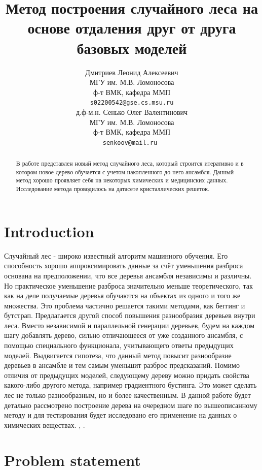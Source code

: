 \documentclass{article}
\title{Метод построения случайного леса на основе отдаления друг от друга базовых моделей}
\author{ Дмитриев Леонид Алексеевич  \\
	МГУ им. М.В. Ломоносова\\
	ф-т ВМК, кафедра ММП\\
	\texttt{s02200542@gse.cs.msu.ru} \\
	\And
	д.ф-м.н. Сенько Олег Валентинович \\
	МГУ им. М.В. Ломоносова\\
	ф-т ВМК, кафедра ММП\\
	\texttt{senkoov@mail.ru } \\
}
\date{}
\begin{document}
\maketitle

\begin{abstract}
	В работе представлен новый метод случайного леса, который строится итеративно и в котором новое дерево обучается с учетом накопленного до него ансамбля. Данный метод хорошо проявляет себя на некоторых химических и медицинских данных. Исследование метода проводилось на датасете кристаллических решеток.
\end{abstract}



\section{Introduction}

Случайный лес - широко известный алгоритм машинного обучения.
Его способность хорошо аппроксимировать данные за счёт
уменьшения разброса основана на предположении, что все деревья
ансамбля независимы и различны. Но практическое уменьшение
разброса значительно меньше теоретического, так как на деле
получаемые деревья обучаются на объектах из одного и того же
множества. Это проблема частично решается такими методами, как
беггинг и бутстрап.
Предлагается другой способ повышения разнообразия деревьев
внутри леса. Вместо независимой и параллельной генерации деревьев,
будем на каждом шагу добавлять дерево, сильно отличающееся от уже
созданного ансамбля, с помощью специального функционала,
учитывающего ответы предыдущих моделей. Выдвигается гипотеза,
что данный метод повысит разнообразие деревьев в ансамбле и тем
самым уменьшит разброс предсказаний.
Помимо отличия от предыдущих моделей, следующему дереву можно
придать свойства какого-либо другого метода, например градиентного
бустинга. Это может сделать лес не только разнообразным, но и более
качественным.
В данной работе будет детально рассмотрено построение дерева на
очередном шаге по вышеописанному методу и для тестирования будет
исследовано его применение на данных о химических веществах. \citep{bibref1}, \citep{bibref2}.

\section{Problem statement}
\label{sec:headings}
\end{document}
